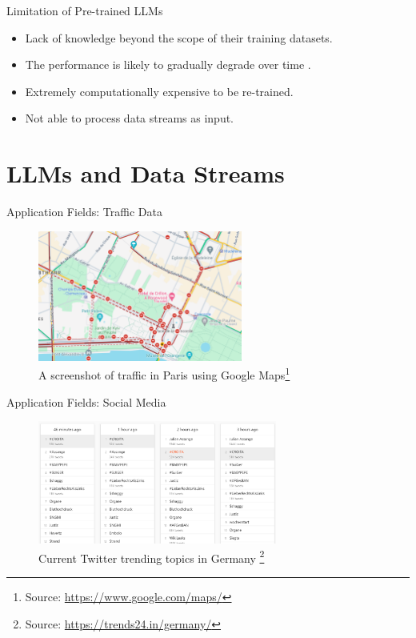 \documentclass[t]{beamer}
\begin{document}
\begin{frame}{Limitation of Pre-trained LLMs}
  \vspace{1cm}
  \begin{itemize}
    \item Lack of knowledge beyond the scope of their training datasets.
    \newline
    \item The performance is likely to gradually degrade over time \cite{Shi24}.
    \newline
    \item Extremely computationally expensive to be re-trained.
    \newline
    \item Not able to process data streams as input.
  \end{itemize}
\end{frame}

\section{LLMs and Data Streams}
\begin{frame}{Application Fields: Traffic Data}
  \begin{figure}
    \centering
    \includegraphics[width=0.6\textwidth]{paris_traffic.png}
    \caption{A screenshot of traffic in Paris using Google Maps\footnote{Source: \url{https://www.google.com/maps/}}}
    \label{fig:paris}
\end{figure}
\end{frame}

\begin{frame}{Application Fields: Social Media}
  \begin{figure}
    \centering
    \includegraphics[width=0.7\textwidth]{trends.png}
    \caption{Current Twitter trending topics in Germany \footnote{Source: \url{https://trends24.in/germany/}}}
    \label{fig:trend}
\end{figure}
\end{frame}
\end{document}
